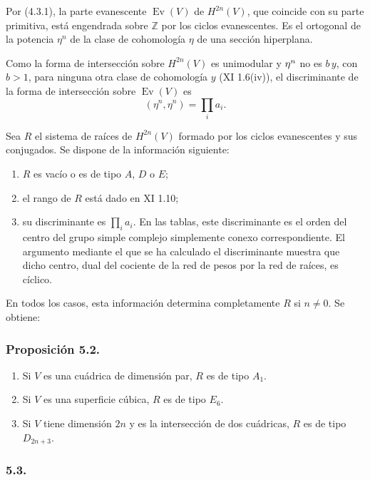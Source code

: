 Por (4.3.1), la parte evanescente $\operatorname{Ev}(V)$ de
$H^{2n}(V)$, que coincide con su parte primitiva, está engendrada sobre
$\mathbb Z$ por los ciclos evanescentes. Es el ortogonal de la potencia
$\eta^n$ de la clase de cohomología $\eta$ de una sección hiperplana.

Como la forma de intersección sobre $H^{2n}(V)$ es unimodular y
$\sisi{\eta^{2n}}{\eta^n}$ no es $b\,y$, con $b>1$, para ninguna otra
clase de cohomología $y$ (XI 1.6(iv)), el discriminante de la forma de
intersección sobre $\operatorname{Ev}(V)$ es
\[
(\eta^n,\eta^n)=\prod_i a_i.
\]

Sea $R$ el sistema de raíces de $H^{2n}(V)$ formado por los ciclos
evanescentes y sus conjugados. Se dispone de la información siguiente:
\begin{enumerate}[label=(\alph*)]
\item $R$ es vacío o es de tipo $A$, $D$ o $E$;
\item el rango de $R$ está dado en XI 1.10;
\item su discriminante es $\prod_i a_i$. En las tablas, este
  discriminante es el orden del centro del grupo simple complejo
  simplemente conexo correspondiente. El argumento mediante el que se
  ha calculado el discriminante muestra que dicho centro, dual del
  cociente de la red de pesos por la red de raíces, es cíclico.
\end{enumerate}

\pageoriginale

En todos los casos, esta información determina completamente $R$ si
$n\ne0$. Se obtiene:

\subsubsection*{Proposición 5.2.}

\begin{enumerate}[label=(\roman*)]
\item Si $V$ es una cuádrica de dimensión par, $R$ es de tipo $A_1$.
\item Si $V$ es una superficie cúbica, $R$ es de tipo $E_6$.
\item Si $V$ tiene dimensión $2n$ y es la intersección de dos
  cuádricas, $R$ es de tipo $D_{2n+3}$.
\end{enumerate}

\subsubsection*{5.3.}

